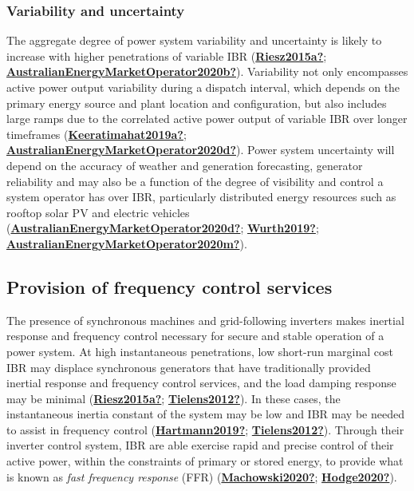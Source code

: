 \documentclass[12pt,a4paper,]{report}
\begin{document}
\hypertarget{variability-and-uncertainty}{%
\subsubsection{Variability and
uncertainty}\label{variability-and-uncertainty}}

The aggregate degree of power system variability and uncertainty is
likely to increase with higher penetrations of variable IBR
(\protect\hyperlink{ref-Riesz2015a}{\textbf{Riesz2015a?}};
\protect\hyperlink{ref-AustralianEnergyMarketOperator2020b}{\textbf{AustralianEnergyMarketOperator2020b?}}).
Variability not only encompasses active power output variability during
a dispatch interval, which depends on the primary energy source and
plant location and configuration, but also includes large ramps due to
the correlated active power output of variable IBR over longer
timeframes
(\protect\hyperlink{ref-Keeratimahat2019a}{\textbf{Keeratimahat2019a?}};
\protect\hyperlink{ref-AustralianEnergyMarketOperator2020d}{\textbf{AustralianEnergyMarketOperator2020d?}}).
Power system uncertainty will depend on the accuracy of weather and
generation forecasting, generator reliability and may also be a function
of the degree of visibility and control a system operator has over IBR,
particularly distributed energy resources such as rooftop solar PV and
electric vehicles
(\protect\hyperlink{ref-AustralianEnergyMarketOperator2020d}{\textbf{AustralianEnergyMarketOperator2020d?}};
\protect\hyperlink{ref-Wurth2019}{\textbf{Wurth2019?}};
\protect\hyperlink{ref-AustralianEnergyMarketOperator2020m}{\textbf{AustralianEnergyMarketOperator2020m?}}).

\hypertarget{provision-of-frequency-control-services}{%
\subsection{Provision of frequency control
services}\label{provision-of-frequency-control-services}}

The presence of synchronous machines and grid-following inverters makes
inertial response and frequency control necessary for secure and stable
operation of a power system. At high instantaneous penetrations, low
short-run marginal cost IBR may displace synchronous generators that
have traditionally provided inertial response and frequency control
services, and the load damping response may be minimal
(\protect\hyperlink{ref-Riesz2015a}{\textbf{Riesz2015a?}};
\protect\hyperlink{ref-Tielens2012}{\textbf{Tielens2012?}}). In these
cases, the instantaneous inertia constant of the system may be low and
IBR may be needed to assist in frequency control
(\protect\hyperlink{ref-Hartmann2019}{\textbf{Hartmann2019?}};
\protect\hyperlink{ref-Tielens2012}{\textbf{Tielens2012?}}). Through
their inverter control system, IBR are able exercise rapid and precise
control of their active power, within the constraints of primary or
stored energy, to provide what is known as \emph{fast frequency
response} (FFR)
(\protect\hyperlink{ref-Machowski2020}{\textbf{Machowski2020?}};
\protect\hyperlink{ref-Hodge2020}{\textbf{Hodge2020?}}).
\end{document}
